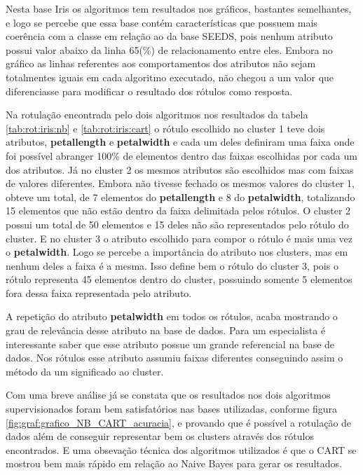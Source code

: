 Nesta base Iris os algoritmos tem resultados nos gráficos, bastantes semelhantes, e logo se percebe que essa base contém características que possuem mais coerência com  a classe em relação ao da base SEEDS, pois nenhum atributo possui valor abaixo da linha 65(\%) de relacionamento entre eles. Embora no gráfico as  linhas referentes aos comportamentos dos atributos não sejam totalmentes iguais em cada algoritmo executado, não chegou a um valor que diferenciasse  para modificar o resultado dos rótulos como resposta.

Na rotulação encontrada pelo dois algoritmos nos resultados da tabela \ref{tab:rot:iris:nb} e \ref{tab:rot:iris:cart} o rótulo escolhido no cluster 1 teve dois atributos, \textbf{petallength} e \textbf{petalwidth} e cada um deles definiram uma faixa onde foi possível abranger 100\% de elementos dentro das faixas escolhidas por cada um dos atributos. Já no cluster 2 os mesmos atributos são escolhidos mas com faixas de valores diferentes. Embora não tivesse fechado os mesmos valores do cluster 1, obteve um total, de 7 elementos do \textbf{petallength} e 8 do \textbf{petalwidth}, totalizando 15 elementos que não estão dentro da faixa delimitada pelos rótulos. O cluster 2 possui um total de 50 elementos e 15 deles não são representados pelo rótulo do cluster. E no cluster 3 o atributo escolhido para compor o rótulo é mais uma vez o \textbf{petalwidth}. Logo se percebe a importância do atributo nos clusters, mas em nenhum deles a faixa é a mesma. Isso define bem o rótulo do cluster 3, pois o rótulo representa 45 elementos dentro do cluster, possuindo somente 5 elementos fora dessa faixa representada pelo atributo.

A repetição do atributo \textbf{petalwidth} em todos os rótulos, acaba mostrando o grau de relevância desse atributo na base de dados. Para um especialista é interessante saber que esse atributo possue um grande referencial na base de dados. Nos rótulos esse atributo assumiu faixas diferentes conseguindo assim o método da um significado ao cluster. 

Com uma breve  análise já se constata que os resultados nos dois algoritmos supervisionados foram bem satisfatórios nas bases utilizadas, conforme figura \ref{fig:graf:grafico_NB_CART_acuracia}, e  provando que é possível a rotulação de dados além de conseguir representar bem os clusters através dos rótulos encontrados. E uma obsevação técnica dos algoritmos utilizados é que o CART se mostrou bem mais rápido em relação ao Naive Bayes para gerar os resultados.


